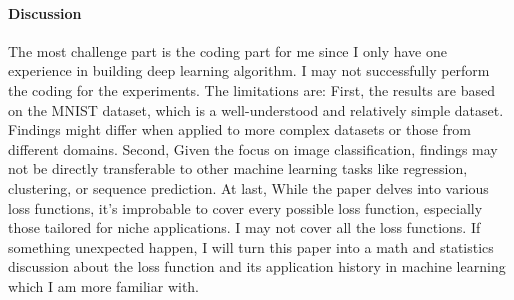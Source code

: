 \documentclass[12pt]{article}
\begin{document}
\paragraph{Discussion}
The most challenge part is the coding part for me since I only have one experience in building deep learning algorithm. I may not successfully perform the coding for the experiments. 
The limitations are: 
First, the results are based on the MNIST dataset, which is a well-understood and relatively simple dataset. Findings might differ when applied to more complex datasets or those from different domains.
Second, Given the focus on image classification, findings may not be directly transferable to other machine learning tasks like regression, clustering, or sequence prediction.
At last, While the paper delves into various loss functions, it's improbable to cover every possible loss function, especially those tailored for niche applications. I may not cover all the loss functions.
If something unexpected happen, I will turn this paper into a math and statistics discussion about the loss function and its application history in machine learning which I am more familiar with.



\end{document}

